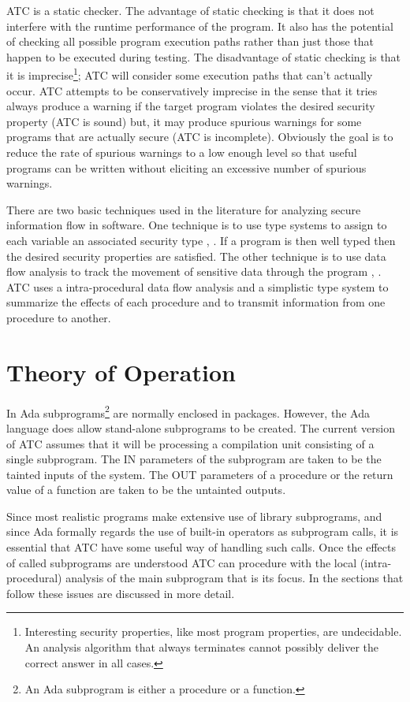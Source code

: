 \documentclass{article}
\begin{document}
ATC is a static checker. The advantage of static checking is that it does not interfere with the runtime performance of the program. It also has the potential of checking all possible program execution paths rather than just those that happen to be executed during testing. The disadvantage of static checking is that it is imprecise\footnote{Interesting security properties, like most program properties, are undecidable. An analysis algorithm that always terminates cannot possibly deliver the correct answer in all cases.}; ATC will consider some execution paths that can't actually occur. ATC attempts to be conservatively imprecise in the sense that it tries always produce a warning if the target program violates the desired security property (ATC is sound) but, it may produce spurious warnings for some programs that are actually secure (ATC is incomplete). Obviously the goal is to reduce the rate of spurious warnings to a low enough level so that useful programs can be written without eliciting an excessive number of spurious warnings.

There are two basic techniques used in the literature for analyzing secure information flow in software. One technique is to use type systems to assign to each variable an associated security type \cite{Volpano:1996-01}, \cite{Volpano:1997}. If a program is then well typed then the desired security properties are satisfied. The other technique is to use data flow analysis to track the movement of sensitive data through the program \cite{Andrews:1980-01}, \cite{Banatre:1994}. ATC uses a intra-procedural data flow analysis and a simplistic type system to summarize the effects of each procedure and to transmit information from one procedure to another.

\section{Theory of Operation}

In Ada subprograms\footnote{An Ada subprogram is either a procedure or a function.} are normally enclosed in packages. However, the Ada language does allow stand-alone subprograms to be created. The current version of ATC assumes that it will be processing a compilation unit consisting of a single subprogram. The IN parameters of the subprogram are taken to be the tainted inputs of the system. The OUT parameters of a procedure or the return value of a function are taken to be the untainted outputs.

Since most realistic programs make extensive use of library subprograms, and since Ada formally regards the use of built-in operators as subprogram calls, it is essential that ATC have some useful way of handling such calls. Once the effects of called subprograms are understood ATC can procedure with the local (intra-procedural) analysis of the main subprogram that is its focus. In the sections that follow these issues are discussed in more detail.
\end{document}
